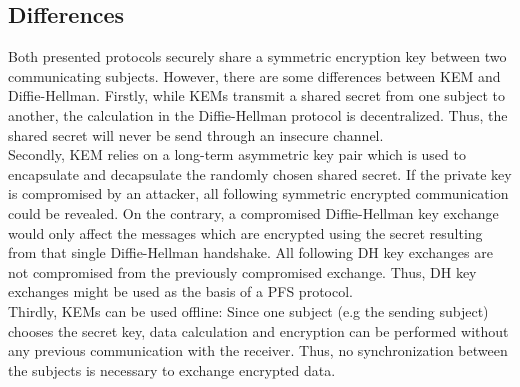 \subsection{Differences}
Both presented protocols securely share a symmetric encryption key between two communicating subjects. However, there are some differences between \gls{KEM} and Diffie-Hellman. Firstly, while \glspl{KEM} transmit a shared secret from one subject to another, the calculation in the Diffie-Hellman protocol is decentralized. Thus, the shared secret will never be send through an insecure channel.\\
Secondly, \gls{KEM} relies on a long-term asymmetric key pair which is used to encapsulate and decapsulate the randomly chosen shared secret. If the private key is compromised by an attacker, all following symmetric encrypted communication could be revealed. On the contrary, a compromised Diffie-Hellman key exchange would only affect the messages which are encrypted using the secret resulting from that single Diffie-Hellman handshake. All following \gls{DH} key exchanges are not compromised from the previously compromised exchange. Thus, \gls{DH} key exchanges might be used as the basis of a \gls{PFS} protocol.\\
Thirdly, KEMs can be used offline: Since one subject (e.g the sending subject) chooses the secret key, data calculation and encryption can be performed without any previous communication with the receiver. Thus, no synchronization between the subjects is necessary to exchange encrypted data.

